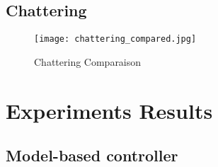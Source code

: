 \subsection{Chattering}


\begin{figure}[htp]
	\centering
		\texttt{[image: chattering\_compared.jpg]}
	\caption[Chattering Comparaison]{Chattering Comparaison}
	\label{fig:ChatteringComparaison}
\end{figure}



\newpage
\section{Experiments Results}
\label{sec:shift_exp}

\subsection{Model-based controller}

